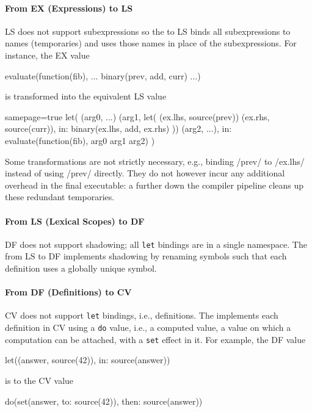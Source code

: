 \documentclass[main.tex]{subfiles}
\begin{document}
\paragraph{From EX (Expressions) to LS} LS does not support subexpressions so the  to LS binds all subexpressions to names (temporaries) and uses those names in place of the subexpressions. For instance, the EX value 
\begin{il}
	evaluate(function(fib), ... binary(prev, add, curr) ...)
\end{il}
is transformed into the equivalent LS value
\begin{il*}{samepage=true}
	let(
		(arg0, ...) (arg1, let(
			(ex.lhs, source(prev)) (ex.rhs, source(curr)),
			in: binary(ex.lhs, add, ex.rhs)
		)) (arg2, ...),
		in: evaluate(function(fib), arg0 arg1 arg2)
	)
\end{il*}

Some transformations are not strictly necessary, e.g., binding \iil/prev/ to \iil/ex.lhs/ instead of using \iil/prev/ directly. They do not however incur any additional overhead in the final executable: a  further down the compiler pipeline cleans up these redundant temporaries.

\paragraph{From LS (Lexical Scopes) to DF} DF does not support shadowing; all \texttt{let} bindings are in a single namespace. The  from LS to DF implements shadowing by renaming symbols such that each definition uses a globally unique symbol.

\paragraph{From DF (Definitions) to CV} CV does not support \texttt{let} bindings, i.e., definitions. The  implements each definition in CV using a \texttt{do} value, i.e., a computed value, a value on which a computation can be attached, with a \texttt{set} effect in it. For example, the DF value
\begin{il}
	let((answer, source(42)), in: source(answer))
\end{il}
is \lowered{} to the CV value
\begin{il}
	do(set(answer, to: source(42)), then: source(answer))
\end{il}
\end{document}
